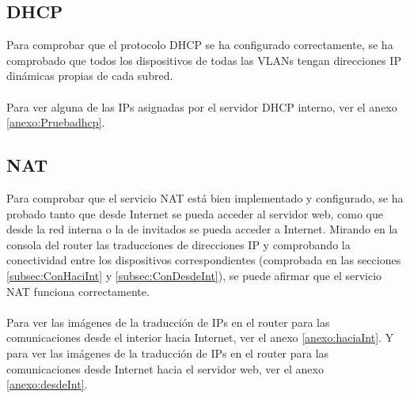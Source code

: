 \subsection{DHCP}
Para comprobar que el protocolo DHCP se ha configurado correctamente, se ha comprobado que todos los dispositivos de todas las VLANs tengan direcciones IP dinámicas propias de cada subred.
\\ \\ 
Para ver alguna de las IPs asignadas por el servidor DHCP interno, ver el anexo \ref{anexo:Pruebadhcp}.

\subsection{NAT}
Para comprobar que el servicio NAT está bien implementado y configurado, se ha probado tanto que desde Internet se pueda acceder al servidor web, como que desde la red interna o la de invitados se pueda acceder a Internet.
Mirando en la consola del router las traducciones de direcciones IP y comprobando la conectividad entre los dispositivos correspondientes (comprobada en las secciones \ref{subsec:ConHaciInt} y \ref{subsec:ConDesdeInt}), se puede afirmar que el servicio NAT funciona correctamente.
\\ \\ 
Para ver las imágenes de la traducción de IPs en el router para las comunicaciones desde el interior hacia Internet, ver el anexo \ref{anexo:haciaInt}. Y para ver las imágenes de la traducción de IPs 
en el router para las comunicaciones desde Internet hacia el servidor web, ver el anexo \ref{anexo:desdeInt}.

